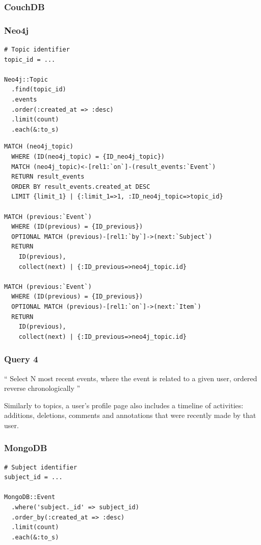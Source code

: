 \subsubsection*{CouchDB}


\subsubsection*{Neo4j}

\begin{verbatim}
# Topic identifier
topic_id = ...

Neo4j::Topic
  .find(topic_id)
  .events
  .order(:created_at => :desc)
  .limit(count)
  .each(&:to_s)
\end{verbatim}

\begin{verbatim}
MATCH (neo4j_topic)
  WHERE (ID(neo4j_topic) = {ID_neo4j_topic})
  MATCH (neo4j_topic)<-[rel1:`on`]-(result_events:`Event`)
  RETURN result_events
  ORDER BY result_events.created_at DESC
  LIMIT {limit_1} | {:limit_1=>1, :ID_neo4j_topic=>topic_id}

MATCH (previous:`Event`)
  WHERE (ID(previous) = {ID_previous})
  OPTIONAL MATCH (previous)-[rel1:`by`]->(next:`Subject`)
  RETURN
    ID(previous),
    collect(next) | {:ID_previous=>neo4j_topic.id}

MATCH (previous:`Event`)
  WHERE (ID(previous) = {ID_previous})
  OPTIONAL MATCH (previous)-[rel1:`on`]->(next:`Item`)
  RETURN
    ID(previous),
    collect(next) | {:ID_previous=>neo4j_topic.id}
\end{verbatim}

\subsubsection{Query 4}
\label{subsubsec:query-4}

``
Select N most recent events, where the event is related to a given user, ordered reverse chronologically
''

Similarly to topics, a user's profile page also includes a timeline of  activities: additions, deletions, comments and annotations that were recently made by that user.

\subsubsection*{MongoDB}

\begin{verbatim}
# Subject identifier
subject_id = ...

MongoDB::Event
  .where('subject._id' => subject_id)
  .order_by(:created_at => :desc)
  .limit(count)
  .each(&:to_s)
\end{verbatim}

